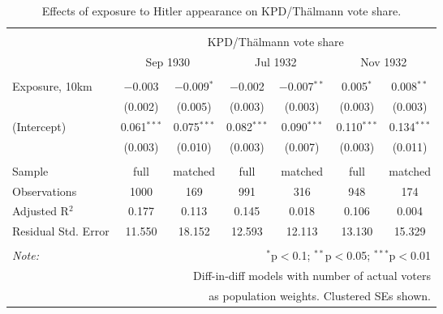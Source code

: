 
\begin{table}[!htbp] \centering 
  \caption{Effects of exposure to Hitler appearance on KPD/Thälmann vote share.} 
  \label{tab:nsdap-kpd-dd-1} 
\begin{tabular}{@{\extracolsep{5pt}}lcccccc} 
\\[-1.8ex]\hline 
\hline \\[-1.8ex] 
 & \multicolumn{6}{c}{KPD/Thälmann vote share} \\ 
\cline{2-7} 
 & \multicolumn{2}{c}{Sep 1930} & \multicolumn{2}{c}{Jul 1932} & \multicolumn{2}{c}{Nov 1932} \\ 
\hline \\[-1.8ex] 
 Exposure, 10km & $-$0.003 & $-$0.009$^{*}$ & $-$0.002 & $-$0.007$^{**}$ & 0.005$^{*}$ & 0.008$^{**}$ \\ 
  & (0.002) & (0.005) & (0.003) & (0.003) & (0.003) & (0.003) \\ 
  (Intercept) & 0.061$^{***}$ & 0.075$^{***}$ & 0.082$^{***}$ & 0.090$^{***}$ & 0.110$^{***}$ & 0.134$^{***}$ \\ 
  & (0.003) & (0.010) & (0.003) & (0.007) & (0.003) & (0.011) \\ 
 \hline \\[-1.8ex] 
Sample & full & matched & full & matched & full & matched \\ 
Observations & 1000 & 169 & 991 & 316 & 948 & 174 \\ 
Adjusted R$^{2}$ & 0.177 & 0.113 & 0.145 & 0.018 & 0.106 & 0.004 \\ 
Residual Std. Error & 11.550 & 18.152 & 12.593 & 12.113 & 13.130 & 15.329 \\ 
\hline 
\hline \\[-1.8ex] 
\textit{Note:}  & \multicolumn{6}{r}{$^{*}$p$<$0.1; $^{**}$p$<$0.05; $^{***}$p$<$0.01} \\ 
 & \multicolumn{6}{r}{Diff-in-diff models with number of actual voters} \\ 
 & \multicolumn{6}{r}{as population weights. Clustered SEs shown.} \\ 
\end{tabular} 
\end{table} 
